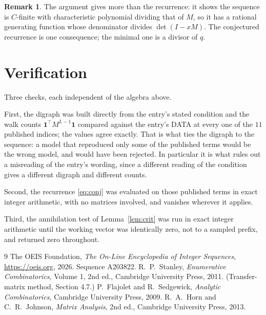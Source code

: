 \documentclass[11pt,a4paper]{article}
\theoremstyle{plain}
\theoremstyle{definition}
\newtheorem{remark}[theorem]{Remark}
\begin{document}
\begin{remark}
The argument gives more than the recurrence: it shows the sequence is $C$-finite with
characteristic polynomial dividing that of $M$, so it has a rational generating function
whose denominator divides $\det(I-xM)$. The conjectured recurrence is one consequence; the
minimal one is a divisor of $q$.
\end{remark}

\section{Verification}

Three checks, each independent of the algebra above.

First, the digraph was built directly from the entry's stated condition and the walk counts
$\mathbf{1}^{\!\top}M^{L-1}\mathbf{1}$ compared against the entry's DATA at
every one of the $11$ published indices; the values agree exactly. That is what ties
the digraph to the sequence: a model that reproduced only some of the published terms would
be the wrong model, and would have been rejected. In particular it is what rules out a
misreading of the entry's wording, since a different reading of the condition gives a
different digraph and different counts.

Second, the recurrence \eqref{eq:conj} was evaluated on those published terms in exact
integer arithmetic, with no matrices involved, and vanishes wherever it applies.

Third, the annihilation test of Lemma~\ref{lem:crit} was run in exact integer arithmetic
until the working vector was identically zero, not to a sampled prefix, and returned zero
throughout.

\begin{thebibliography}{9}
 The OEIS Foundation, \emph{The On-Line Encyclopedia of Integer
Sequences}, \url{https://oeis.org}, 2026. Sequence A203822.
 R.~P.~Stanley, \emph{Enumerative Combinatorics}, Volume 1, 2nd ed.,
Cambridge University Press, 2011. (Transfer-matrix method, Section 4.7.)
 P.~Flajolet and R.~Sedgewick, \emph{Analytic Combinatorics}, Cambridge
University Press, 2009.
 R.~A.~Horn and C.~R.~Johnson, \emph{Matrix Analysis}, 2nd ed., Cambridge
University Press, 2013.
\end{thebibliography}
\end{document}
